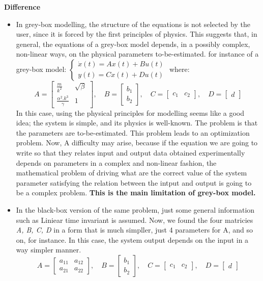 \textbf{Difference} 
\begin{itemize}
\item In grey-box modelling, the structure of the equations is not selected by the user, since it is forced by the first principles of physics. This suggests that, in general, the equations of a grey-box model depends, in a possibly complex, non-linear ways, on the physical parameters to-be-estimated.\newline
for instance of a grey-box model:
$\begin{cases}
    \dot{x}(t) = A x(t) + B u(t) \\
    y(t) = C x(t) + D u(t)
\end{cases}$ where:
\newline
\[
A = \begin{bmatrix}
\frac{m}{k^2} & \sqrt{\beta} \\
\frac{\alpha^2.k^3}{\gamma} & 1  
\end{bmatrix}, \quad
B = \begin{bmatrix}
b_1 \\
b_2
\end{bmatrix}, \quad
C = \begin{bmatrix}
c_1 & c_2
\end{bmatrix}, \quad
D = \begin{bmatrix}
d
\end{bmatrix}
\]
In this case, using the physical principles for modelling seems like a good idea; the system is simple, and its physics is well-known. The problem is that the parameters are to-be-estimated. This problem leads to an optimization problem. Now, A difficulty may arise, because if the equation we are going to write so that they relates input and output data obtained experimentally depends on parameters in a complex and non-linear fashion, the mathematical problem of driving what are the correct value of the system parameter satisfying the relation between the intput and output is going to be a complex problem. \textbf{This is the main limitation of grey-box model.}

\item In the black-box version of the same problem, just some general information such as Liniear time invariant is assumed. Now, we found the four matricies \textit{A, B, C, D} in a form that is much simpller, just 4 parameters for A, and so on, for instance. In this case, the system output depends on the input in a way simpler manner.
\[
A = \begin{bmatrix}
a_{11} & a_{12} \\
a_{21} & a_{22}  
\end{bmatrix}, \quad
B = \begin{bmatrix} 
b_1 \\
b_2
\end{bmatrix}, \quad
C = \begin{bmatrix}
c_1 & c_2
\end{bmatrix}, \quad
D = \begin{bmatrix}
d
\end{bmatrix}
\]\newline



\end{itemize}
